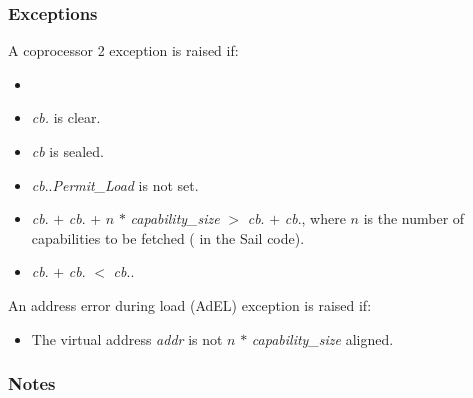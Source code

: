 
\subsubsection*{Exceptions}

A coprocessor 2 exception is raised if:

\begin{itemize}
\item
\cchecktag{}
\item
\emph{cb.\ctag{}} is clear.
\item
\emph{cb} is sealed.
\item
\emph{cb}.\cperms.\emph{Permit\_Load} is not set.
\item
\emph{cb}.\cbase{} $+$ \emph{cb}.\coffset{} + $n$ $*$ \emph{capability\_size} $>$ \emph{cb}.\cbase{} $+$ \emph{cb}.\clength{},
		where $n$ is the number of capabilities to be fetched ( in the Sail code).
\item
\emph{cb}.\cbase{} $+$ \emph{cb}.\coffset{} $<$ \emph{cb}.\cbase{}.
\end{itemize}

An address error during load (AdEL) exception is raised if:

\begin{itemize}
\item
The virtual address \emph{addr} is not $n$ $*$ \emph{capability\_size} aligned.
\end{itemize}

\subsubsection*{Notes}

